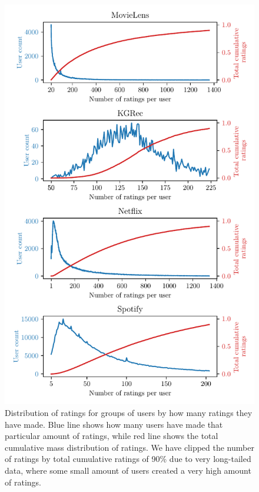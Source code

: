 \begin{figure}[ht!]
    \centering
    \includegraphics{img/figures/num_users_by_rating_count.pdf}
    \caption[Distribution of ratings]{Distribution of ratings for groups of users by how many ratings they have made. Blue line shows how many users have made that particular amount of ratings, while red line shows the total cumulative mass distribution of ratings. We have clipped the number of ratings by total cumulative ratings of 90\% due to very long-tailed data, where some small amount of users created a very high amount of ratings.}
    \label{fig:datasets_num_ratings}
\end{figure}

